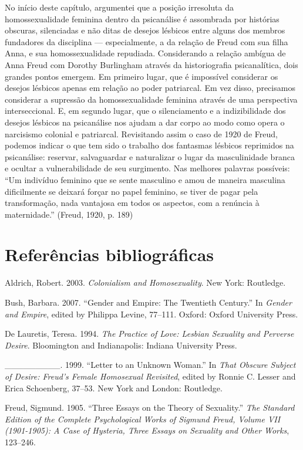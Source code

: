 No início deste capítulo, argumentei que a posição irresoluta da
homossexualidade feminina dentro da psicanálise é assombrada por
histórias obscuras, silenciadas e não ditas de desejos lésbicos entre
alguns dos membros fundadores da disciplina --- especialmente, a da
relação de Freud com sua filha Anna, e sua homossexualidade repudiada.
Considerando a relação ambígua de Anna Freud com Dorothy Burlingham
através da historiografia psicanalítica, dois grandes pontos emergem. Em
primeiro lugar, que é impossível considerar os desejos lésbicos apenas
em relação ao poder patriarcal. Em vez disso, precisamos considerar a
supressão da homossexualidade feminina através de uma perspectiva
interseccional. E, em segundo lugar, que o silenciamento e a
indizibilidade dos desejos lésbicos na psicanálise nos ajudam a dar
corpo ao modo como opera o narcisismo colonial e patriarcal. Revisitando
assim o caso de 1920 de Freud, podemos indicar o que tem sido o trabalho
dos fantasmas lésbicos reprimidos na psicanálise: reservar, salvaguardar
e naturalizar o lugar da masculinidade branca e ocultar a
vulnerabilidade de seu surgimento. Nas melhores palavras possíveis: ``Um
indivíduo feminino que se sente masculino e amou de maneira masculina
dificilmente se deixará forçar no papel feminino, se tiver de pagar pela
transformação, nada vantajosa em todos os aspectos, com a renúncia à
maternidade.'' (Freud, 1920, p. 189)

\section{Referências bibliográficas}

Aldrich, Robert. 2003. \emph{Colonialism and Homosexuality}. New York:
Routledge.

Bush, Barbara. 2007. ``Gender and Empire: The Twentieth Century.'' In
\emph{Gender and Empire}, edited by Philippa Levine, 77--111. Oxford:
Oxford University Press.

De Lauretis, Teresa. 1994. \emph{The Practice of Love: Lesbian Sexuality
and Perverse Desire}. Bloomington and Indianapolis: Indiana University
Press.

\_\_\_\_\_\_\_\_\_. 1999. ``Letter to an Unknown Woman.'' In \emph{That Obscure
Subject of Desire: Freud's Female Homosexual Revisited}, edited by
Ronnie C. Lesser and Erica Schoenberg, 37--53. New York and London:
Routledge.

Freud, Sigmund. 1905. ``Three Essays on the Theory of Sexuality.''
\emph{The Standard Edition of the Complete Psychological Works of
Sigmund Freud, Volume VII (1901-1905): A Case of Hysteria, Three Essays
on Sexuality and Other Works}, 123--246.

